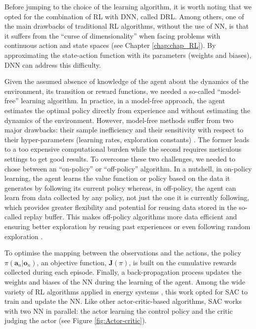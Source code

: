 \newpage
Before jumping to the choice of the learning algorithm, it is worth noting that we opted for the combination of \gls{RL} with \gls{DNN}, called \gls{DRL}. Among others, one of the main drawbacks of traditional \gls{RL} algorithms, \ie without the use of \gls{NN},  is that it suffers from the ``curse of dimensionality'' when facing problems with continuous action and state spaces (see Chapter \ref{chap:chap_RL}). By approximating the state-action function with its parameters (\ie weights and biases), \gls{DNN} can address this difficulty. 

Given the assumed absence of knowledge of the agent about the dynamics of the environment, \ie its transition or reward functions, we needed a so-called ``model-free'' learning algorithm. In practice, in a model-free approach, the agent estimates the optimal policy directly from experience and without estimating the dynamics of the environment. However, model-free methods suffer from two major drawbacks: their sample inefficiency and their sensitivity with respect to their hyper-parameters (\eg learning rates, exploration constants) \cite{haarnoja2018soft}. The former leads to a too expensive computational burden while the second requires meticulous settings to get good results.  To overcome these two challenges, we needed to chose between an ``on-policy'' or ``off-policy'' algorithm. In a nutshell, in on-policy learning, the agent learns the value function or policy based on the data it generates by following its current policy whereas, in off-policy, the agent can learn from data collected by any policy, not just the one it is currently following, which provides greater flexibility and potential for reusing data stored in the so-called replay buffer. This makes off-policy algorithms more data efficient and ensuring better exploration by reusing past experiences or even following random exploration \cite{haarnoja2018soft}.

To optimise the mapping between the observations and the actions, the policy $\pi\left(\bm{a}_n | \bm{o}_n\right)$, an objective function, $\bm{J}(\pi)$, is built on the cumulative rewards collected during each episode. Finally, a back-propagation process updates the weights and biases of the \gls{NN} during the learning of the agent. Among the wide variety of \gls{RL} algorithms applied in energy systems \cite{perera2021applications}, this work opted for \gls{SAC} \cite{haarnoja2018soft} to train and update the \gls{NN}.  Like other actor-critic-based algorithms, \gls{SAC} works with two \gls{NN} in parallel: the actor learning the control policy and the critic judging the actor (see Figure \ref{fig:Actor-critic}).

